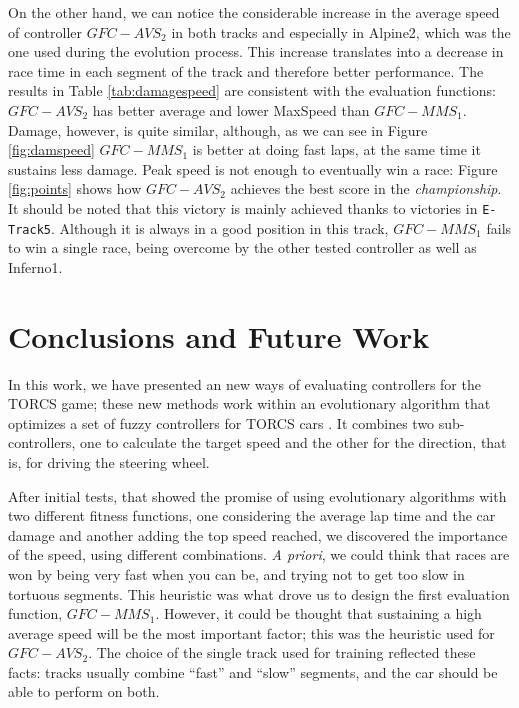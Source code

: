 \documentclass[conference]{IEEEtran}
\begin{document}
On the other hand, we can notice the considerable increase in the
average speed of controller $GFC-AVS_2$ in both tracks and especially
in Alpine2, which was the one used during the evolution process. This
increase translates into a decrease in race time in each segment of
the track and therefore better performance. The results in Table
\ref{tab:damagespeed} are consistent with the evaluation functions:
$GFC-AVS_2$ has better average and lower MaxSpeed than
$GFC-MMS_1$. Damage, however, is quite similar, although, as we can
see in Figure \ref{fig:damspeed} $GFC-MMS_1$ is better at doing fast
laps, at the same time it sustains less damage. Peak speed is not
enough to eventually win a race: Figure \ref{fig:points} shows how
$GFC-AVS_2$ achieves the best score in the {\em championship}. It
should be noted that this victory is mainly achieved thanks to
victories in {\tt E-Track5}. Although it is always in a good position
in this track, $GFC-MMS_1$ fails to win a single race, being overcome
by the other tested controller as well as Inferno1.



\section{Conclusions and Future Work} 
\label{sec:conclusions}

In this work, we have presented an new ways of evaluating controllers
for the TORCS game; these new methods work within an evolutionary
algorithm that optimizes a set of fuzzy controllers for TORCS cars \cite{evo17}. It combines two
sub-controllers, one to calculate the target speed and the other for
the direction, that is, for driving the steering wheel. 

After initial tests, that showed the promise of using evolutionary
algorithms with two different fitness functions, one considering the
average lap time and the car damage and another adding the top speed
reached, we discovered the importance of the speed, using different
combinations. {\em A priori}, we could think that races are won by
being very fast when you can be, and trying not to get too slow in
tortuous segments. This heuristic was what drove us to design the
first evaluation function, \textbf{$GFC-MMS_1$}. However, it could be
thought that sustaining a high average speed will be the most
important factor; this was the heuristic used for
\textbf{$GFC-AVS_2$}. The choice of the single track used for training
reflected these facts: tracks usually combine ``fast'' and ``slow''
segments, and the car should be able to perform on both.
\end{document}
